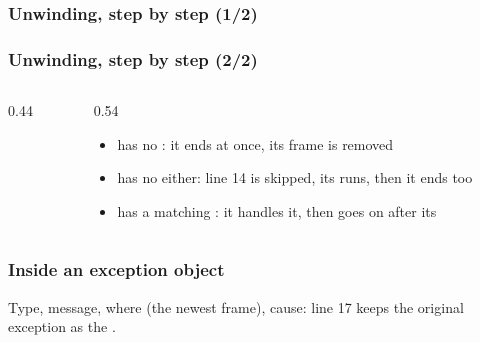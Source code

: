 \documentclass[aspectratio=169,10pt,compress]{beamer}
\begin{document}
\begin{frame}[t,fragile] \frametitle{Unwinding, step by step (1/2)}

	\small {}
\end{frame}




\begin{frame}[t,fragile] \frametitle{Unwinding, step by step (2/2)}
	\begin{columns}[T]
		\begin{column}{0.44\textwidth}
		\end{column}
		\begin{column}{0.54\textwidth}
			\begin{itemize}\small
				\item {} has no : it ends at once, its frame is removed
				\item {} has no  either: line 14 is skipped, its  runs, then it ends too
				\item {} has a matching : it handles it, then goes on after its 
			\end{itemize}
		\end{column}
	\end{columns}
\end{frame}








\begin{frame}[t,fragile] \frametitle{Inside an exception object}

	\footnotesize Type, message, where (the newest frame), cause: line 17 keeps the original exception as the .
\end{frame}
\end{document}
